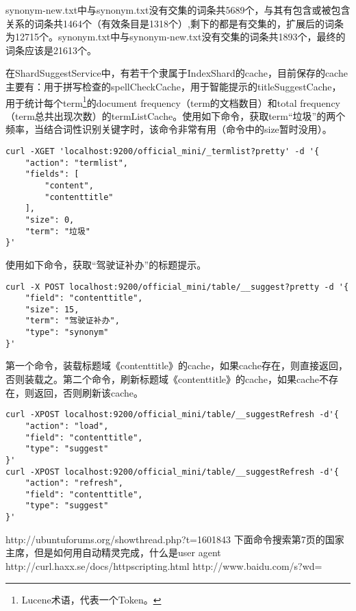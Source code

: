 \par synonym-new.txt中与synonym.txt没有交集的词条共5689个，与其有包含或被包含关系的词条共1464个（有效条目是1318个）,剩下的都是有交集的，扩展后的词条为12715个。synonym.txt中与synonym-new.txt没有交集的词条共1893个，最终的词条应该是21613个。
\par 在ShardSuggestService中，有若干个隶属于IndexShard的cache，目前保存的cache主要有：用于拼写检查的spellCheckCache，用于智能提示的titleSuggestCache，用于统计每个term\footnote{Lucene术语，代表一个Token。}的document frequency（term的文档数目）和total frequency（term总共出现次数）的termListCache。使用如下命令，获取term“垃圾”的两个频率，当结合词性识别关键字时，该命令非常有用（命令中的size暂时没用）。
\begin{verbatim}
curl -XGET 'localhost:9200/official_mini/_termlist?pretty' -d '{
    "action": "termlist", 
    "fields": [
        "content", 
        "contenttitle"
    ], 
    "size": 0, 
    "term": "垃圾"
}'
\end{verbatim}
\par 使用如下命令，获取“驾驶证补办”的标题提示。
\begin{verbatim}
curl -X POST localhost:9200/official_mini/table/__suggest?pretty -d '{
    "field": "contenttitle", 
    "size": 15, 
    "term": "驾驶证补办", 
    "type": "synonym"
}'
\end{verbatim}
\par 第一个命令，装载标题域《contenttitle》的cache，如果cache存在，则直接返回，否则装载之。第二个命令，刷新标题域《contenttitle》的cache，如果cache不存在，则返回，否则刷新该cache。
\begin{verbatim}
curl -XPOST localhost:9200/official_mini/table/__suggestRefresh -d'{
    "action": "load", 
    "field": "contenttitle", 
    "type": "suggest"
}'
curl -XPOST localhost:9200/official_mini/table/__suggestRefresh -d'{   
    "action": "refresh", 
    "field": "contenttitle", 
    "type": "suggest"
}'
\end{verbatim}
\par http://ubuntuforums.org/showthread.php?t=1601843
下面命令搜索第7页的国家主席，但是如何用自动精灵完成，什么是user agent
http://curl.haxx.se/docs/httpscripting.html
http://www.baidu.com/s?wd=%
